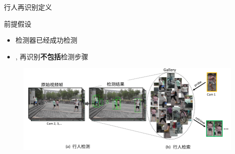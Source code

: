 \documentclass[notes]{beamer}
\begin{document}
\begin{frame}
	{行人再识别定义}
	\begin{block}{前提假设}
		\begin{itemize}
			\item 检测器已经成功检测
			\item \ie, 再识别{\bf 不包括}检测步骤
		\end{itemize}
	\end{block}
	\begin{figure}
		\includegraphics[width=1\linewidth]{background.png}
	\end{figure}
\end{frame}
		
\end{document}

